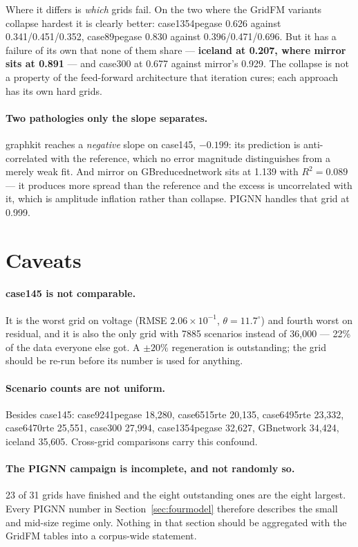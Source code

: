 \documentclass[10pt]{article}
\begin{document}
Where it differs is \emph{which} grids fail. On the two where the GridFM
variants collapse hardest it is clearly better: case1354pegase 0.626 against
0.341/0.451/0.352, case89pegase 0.830 against 0.396/0.471/0.696. But it has a
failure of its own that none of them share --- \textbf{iceland at 0.207, where
mirror sits at 0.891} --- and case300 at 0.677 against mirror's 0.929. The
collapse is not a property of the feed-forward architecture that iteration
cures; each approach has its own hard grids.

\paragraph{Two pathologies only the slope separates.} graphkit reaches a
\emph{negative} slope on case145, $-0.199$: its prediction is anti-correlated
with the reference, which no error magnitude distinguishes from a merely weak
fit. And mirror on GBreducednetwork sits at 1.139 with $R^2 = 0.089$ --- it
produces more spread than the reference and the excess is uncorrelated with it,
which is amplitude inflation rather than collapse. PIGNN handles that grid at
0.999.


\section{Caveats}

\paragraph{case145 is not comparable.} It is the worst grid on voltage
(RMSE $2.06\times10^{-1}$, $\theta = 11.7^\circ$) and fourth worst on residual,
and it is also the only grid with 7885 scenarios instead of 36{,}000 --- 22\% of
the data everyone else got. A $\pm20\%$ regeneration is outstanding; the grid
should be re-run before its number is used for anything.

\paragraph{Scenario counts are not uniform.} Besides case145: case9241pegase
18{,}280, case6515rte 20{,}135, case6495rte 23{,}332, case6470rte 25{,}551,
case300 27{,}994, case1354pegase 32{,}627, GBnetwork 34{,}424, iceland 35{,}605.
Cross-grid comparisons carry this confound.

\paragraph{The PIGNN campaign is incomplete, and not randomly so.} 23 of 31
grids have finished and the eight outstanding ones are the eight largest. Every
PIGNN number in Section~\ref{sec:fourmodel} therefore describes the small and
mid-size regime only. Nothing in that section should be aggregated with the
GridFM tables into a corpus-wide statement.
\end{document}
